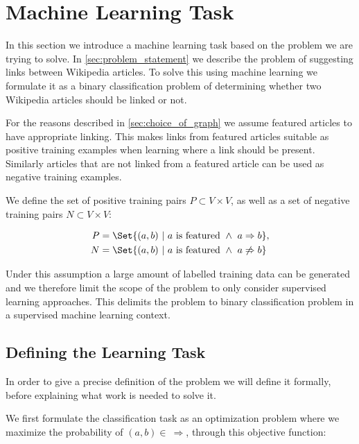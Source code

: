 \section{Machine Learning Task}\label{sec:machine_learning_task}
In this section we introduce a machine learning task based on the problem we are trying to solve. In \cref{sec:problem_statement} we describe the problem of suggesting links between Wikipedia articles. To solve this using machine learning we formulate it as a binary classification problem of determining whether two Wikipedia articles should be linked or not.

For the reasons described in \cref{sec:choice_of_graph} we assume featured articles to have appropriate linking. This makes links from featured articles suitable as positive training examples when learning where a link should be present. Similarly articles that are not linked from a featured article can be used as negative training examples.

We define the set of positive training pairs $P \subset V \times V$, as well as a set of negative training pairs $N \subset V \times V$:

\begin{align*}
P &= \Set{(a,b)\ |\ a\text{ is featured}\ \wedge\ a \Rightarrow b}, \\
N &= \Set{(a,b)\ |\ a\text{ is featured}\ \wedge\ a \not\Rightarrow b}
\end{align*}

Under this assumption a large amount of labelled training data can be generated and we therefore limit the scope of the problem to only consider supervised learning approaches. This delimits the problem to binary classification problem in a supervised machine learning context. 

\subsection{Defining the Learning Task}
In order to give a precise definition of the problem we will define it formally, before explaining what work is needed to solve it.

We first formulate the classification task as an optimization problem where we maximize the probability of $(a,b) \in \ \Rightarrow$, through this objective function:

